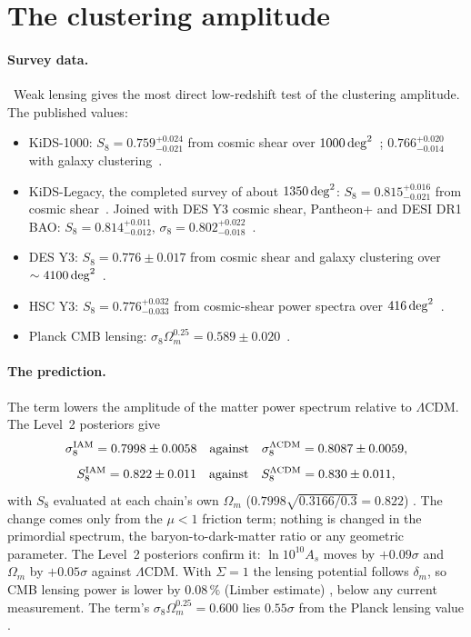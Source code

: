\section{The clustering amplitude}\label{sec:st_lensing}
\paragraph{Survey data.} \observed\ Weak lensing gives the most direct low-redshift test of the clustering amplitude. The published values:
\begin{itemize}
\item KiDS-1000: $S_8=0.759^{+0.024}_{-0.021}$ from cosmic shear over $1000\,{\rm deg}^2$~\cite{Asgari2021}; $0.766^{+0.020}_{-0.014}$ with galaxy
clustering~\cite{Heymans2021}.
\item KiDS-Legacy, the completed survey of about $1350\,{\rm deg}^2$: $S_8=0.815^{+0.016}_{-0.021}$ from cosmic shear~\cite{Wright2025}. Joined with DES Y3 cosmic shear, Pantheon+ and DESI DR1 BAO:
$S_8=0.814^{+0.011}_{-0.012}$, $\sigma_8=0.802^{+0.022}_{-0.018}$~\cite{Stolzner2025}.
\item DES Y3: $S_8=0.776\pm0.017$ from cosmic shear and galaxy clustering over $\sim4100\,{\rm deg}^2$~\cite{DESY3}.
\item HSC Y3: $S_8=0.776^{+0.032}_{-0.033}$ from cosmic-shear power spectra over $416\,{\rm deg}^2$~\cite{HSCY3Dalal}.
\item Planck CMB lensing: $\sigma_8\Omega_m^{0.25}=0.589\pm0.020$~\cite{Planck2018VIII}.
\end{itemize}

\paragraph{The prediction.} The term lowers the amplitude of the matter power spectrum relative to $\Lambda$CDM. The Level~2 posteriors give \measured
\begin{equation}
\sigma_8^{\rm IAM}=0.7998\pm0.0058\quad\text{against}\quad\sigma_8^{\Lambda\rm CDM}=0.8087\pm0.0059,
\label{eq:st_sigma8}\end{equation}
\begin{equation}
S_8^{\rm IAM}=0.822\pm0.011\quad\text{against}\quad S_8^{\Lambda\rm CDM}=0.830\pm0.011,
\label{eq:st_S8}\end{equation}
with $S_8$ evaluated at each chain's own $\Omega_m$ ($0.7998\sqrt{0.3166/0.3}=0.822$) \calc. The change comes only from the $\mu<1$ friction term; nothing
is changed in the primordial spectrum, the baryon-to-dark-matter ratio or any geometric parameter. The Level~2 posteriors confirm it: $\ln10^{10}A_s$
moves by $+0.09\sigma$ and $\Omega_m$ by $+0.05\sigma$ against $\Lambda$CDM. With $\Sigma=1$ the lensing potential follows $\delta_m$, so CMB
lensing power is lower by $0.08\,\%$ (Limber estimate) \calc, below any current measurement. The term's $\sigma_8\Omega_m^{0.25}=0.600$ lies $0.55\sigma$
from the Planck lensing value \calc.

